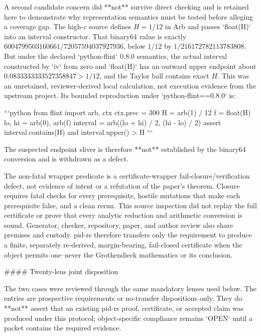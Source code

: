 \documentclass[11pt]{article}
\begin{document}
\begin{markdown}
A second candidate concern did **not** survive direct checking and is retained here to demonstrate
why representation semantics must be tested before alleging a coverage gap. The high-$c$ source
defines $H=1/12$ in Arb and passes `float(H)` into an interval constructor. That binary64 value is
exactly $6004799503160661/72057594037927936$, below $1/12$ by
$1/216172782113783808$. But under the declared `python-flint` 0.8.0 semantics, the actual interval
constructed by `iv` from zero and `float(H)` has an outward upper endpoint about
$0.0833333333527358847>1/12$, and the Taylor ball contains exact $H$. This was an unretained,
reviewer-derived local calculation, not execution evidence from the upstream project. Its bounded
reproduction under `python-flint==0.8.0` is:

```python
from flint import arb, ctx
ctx.prec = 300
H = arb(1) / 12
f = float(H)
lo, hi = arb(0), arb(f)
interval = arb((lo + hi) / 2, (hi - lo) / 2)
assert interval.contains(H) and interval.upper() > H
```

The suspected endpoint sliver is therefore **not** established by the binary64 conversion and is
withdrawn as a defect.

The non-fatal wrapper predicate is a certificate-wrapper fail-closure/verification defect, not
evidence of intent or a refutation
of the paper's theorem. Closure requires fatal checks for every prerequisite, hostile mutations
that make each prerequisite false, and a clean rerun. This source inspection did not replay the
full certificate or prove that every analytic reduction and arithmetic conversion is sound.
Generator, checker, repository, paper, and author review also share premises and custody. pid-rs
therefore transfers only the requirement to produce a finite, separately re-derived,
margin-bearing, fail-closed certificate when the object permits one--never the Grothendieck
mathematics or its conclusion.

#### Twenty-lens joint disposition

The two cases were reviewed through the same mandatory lenses used below. The entries are
prospective requirements or no-transfer dispositions only. They do **not** assert that an existing
pid-rs proof, certificate, or accepted claim was produced under this protocol; object-specific
compliance remains `OPEN` until a packet contains the required evidence.


\end{markdown}
\end{document}
